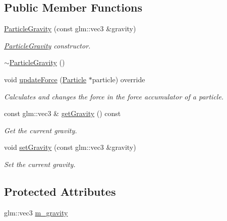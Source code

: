 \subsection*{Public Member Functions}
\begin{DoxyCompactItemize}
\item 
\mbox{\hyperlink{classr3_1_1_particle_gravity_a698440df6351766d4c5c3c7704bdead6}{Particle\+Gravity}} (const glm\+::vec3 \&gravity)
\begin{DoxyCompactList}\small\item\em \mbox{\hyperlink{classr3_1_1_particle_gravity}{Particle\+Gravity}} constructor. \end{DoxyCompactList}\item 
\mbox{\hyperlink{classr3_1_1_particle_gravity_a7130786765cc4befe6808a70254871bc}{$\sim$\+Particle\+Gravity}} ()
\item 
void \mbox{\hyperlink{classr3_1_1_particle_gravity_a2730d87272fcc1c29d143f3a7eb8ffa9}{update\+Force}} (\mbox{\hyperlink{classr3_1_1_particle}{Particle}} $\ast$particle) override
\begin{DoxyCompactList}\small\item\em Calculates and changes the force in the force accumulator of a particle. \end{DoxyCompactList}\item 
const glm\+::vec3 \& \mbox{\hyperlink{classr3_1_1_particle_gravity_a12488a0a88c2f0b2b94ae29d376d2d03}{get\+Gravity}} () const
\begin{DoxyCompactList}\small\item\em Get the current gravity. \end{DoxyCompactList}\item 
void \mbox{\hyperlink{classr3_1_1_particle_gravity_af5caf366933860ee362f40337d82ae61}{set\+Gravity}} (const glm\+::vec3 \&gravity)
\begin{DoxyCompactList}\small\item\em Set the current gravity. \end{DoxyCompactList}\end{DoxyCompactItemize}
\subsection*{Protected Attributes}
\begin{DoxyCompactItemize}
\item 
glm\+::vec3 \mbox{\hyperlink{classr3_1_1_particle_gravity_a4e21b444ed08aa8c66ca40a11f34c384}{m\+\_\+gravity}}
\end{DoxyCompactItemize}
